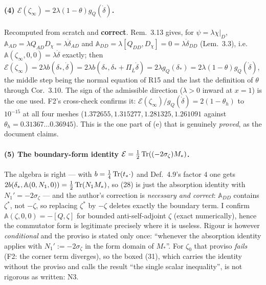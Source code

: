 \documentclass[11pt]{article}
\newcommand{\Aop}{\mathbb A}
\begin{document}
\paragraph{(4) $\mathcal E(\zeta_\infty)=2\lambda(1-\theta)g_Q(\dot\delta)$.}  Recomputed
from scratch and \textbf{correct}.  Rem.~3.13 gives, for $\psi=\lambda\chi|_D$,
$\Aop_{AD}=\lambda Q_{AD}D_\chi=\lambda\dot\delta_{AD}$ and
$\Aop_{DD}=\lambda[Q_{DD},D_\chi]=0=\lambda\dot\delta_{DD}$ (Lem.~3.3), i.e.\
$\Aop(\zeta_\infty,0,0)=\lambda\dot\delta$ exactly; then
$\mathcal E(\zeta_\infty)=2\lambda b(\delta_*,\dot\delta)
=2\lambda b(\delta_*,\delta_*+\Pi_{\overline L}\dot\delta)=2\lambda g_Q(\delta_*)
=2\lambda(1-\theta)g_Q(\dot\delta)$, the middle step being the normal equation of R15 and
the last the definition of $\theta$ through Cor.~3.10.  The sign of the admissible
direction ($\lambda>0$ inward at $x=1$) is the one used.  F2's cross-check confirms it:
$\mathcal E(\zeta_\infty)/g_Q(\dot\delta)=2(1-\theta_h)$ to $10^{-15}$ at all four meshes
($1.372655,1.315277,1.281325,1.261091$ against $\theta_h=0.31367\ldots0.36945$).  This is
the one part of (e) that is genuinely \emph{proved}, as the document claims.

\paragraph{(5) The boundary-form identity $\mathcal E=\frac12\operatorname{Tr}((-2\sigma_\zeta)M_*)$.}
The algebra is right --- with $b=\frac14\operatorname{Tr}(t_*\cdot)$ and Def.~4.9's factor $4$ one gets
$2b(\delta_*,\Aop(0,N_1,0))=\frac12\Tr(N_1M_*)$, so (28) is just the absorption
identity with $N_1'=-2\sigma_\zeta$ --- and the author's correction is \emph{necessary and
correct}: $\Aop_{DD}$ contains $\zeta^*$, not $-\zeta$, so replacing $\zeta^*$ by $-\zeta$
deletes exactly the boundary term.  I confirm $\Aop(\zeta,0,0)=-[Q,\zeta]$ for bounded
anti-self-adjoint $\zeta$ (exact numerically), hence the commutator form is legitimate
precisely where it is useless.  Rigour is however \emph{conditional} and the proviso is
stated only once: ``whenever the absorption identity applies with $N_1':=-2\sigma_\zeta$ in
the form domain of $M_*$''.  For $\zeta_0$ that proviso \emph{fails} (F2: the corner term
diverges), so the boxed (31), which carries the identity without the proviso
and calls the result ``the single scalar inequality'', is not rigorous as written: N3.
\end{document}
